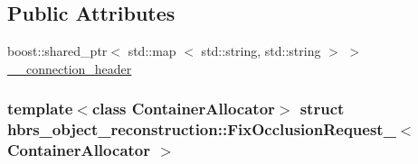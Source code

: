 \subsection*{\-Public \-Attributes}
\begin{DoxyCompactItemize}
\item 
boost\-::shared\-\_\-ptr$<$ std\-::map\*
$<$ std\-::string, std\-::string $>$ $>$ \hyperlink{structhbrs__object__reconstruction_1_1_fix_occlusion_request___ac05d4186ac4621275d62e4514ae308fc}{\-\_\-\-\_\-connection\-\_\-header}
\end{DoxyCompactItemize}
\subsubsection*{template$<$class Container\-Allocator$>$ struct hbrs\-\_\-object\-\_\-reconstruction\-::\-Fix\-Occlusion\-Request\-\_\-$<$ Container\-Allocator $>$}



